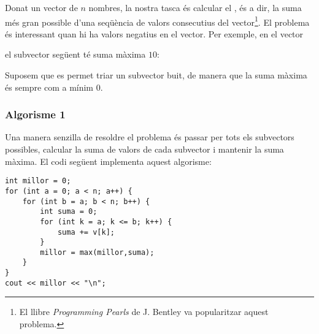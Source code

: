 Donat un vector de $n$ nombres,
la nostra tasca és calcular el
, és a dir,
la suma més gran possible d'una
seqüència de valors consecutius
del vector\footnote{El llibre \emph{Programming Pearls} \cite{ben86} de J. Bentley va popularitzar aquest problema.}.
El problema és interessant quan hi ha valors
negatius en el vector.
Per exemple, en el vector
\begin{center}
\end{center}
\begin{samepage}
el subvector següent té suma màxima $10$:
\begin{center}
\end{center}
\end{samepage}

Suposem que es permet triar un subvector buit,
de manera que la suma màxima és sempre com a mínim $0$.

\subsubsection{Algorisme 1}

Una manera senzilla de resoldre el problema
és passar per tots els subvectors possibles,
calcular la suma de valors de cada subvector i mantenir
la suma màxima.
El codi següent implementa aquest algorisme:

\begin{lstlisting}
int millor = 0;
for (int a = 0; a < n; a++) {
    for (int b = a; b < n; b++) {
        int suma = 0;
        for (int k = a; k <= b; k++) {
            suma += v[k];
        }
        millor = max(millor,suma);
    }
}
cout << millor << "\n";
\end{lstlisting}

